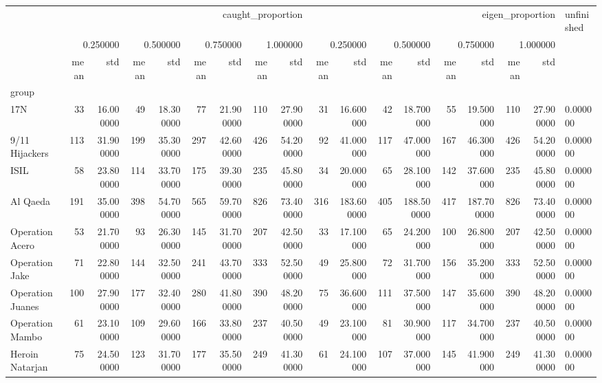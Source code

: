 \begin{tabular}{lrrrrrrrrrrrrrrrrl}
 & \multicolumn{8}{r}{caught_proportion} & \multicolumn{8}{r}{eigen_proportion} & unfinished \\
 & \multicolumn{2}{r}{0.250000} & \multicolumn{2}{r}{0.500000} & \multicolumn{2}{r}{0.750000} & \multicolumn{2}{r}{1.000000} & \multicolumn{2}{r}{0.250000} & \multicolumn{2}{r}{0.500000} & \multicolumn{2}{r}{0.750000} & \multicolumn{2}{r}{1.000000} &  \\
 & mean & std & mean & std & mean & std & mean & std & mean & std & mean & std & mean & std & mean & std &  \\
group &  &  &  &  &  &  &  &  &  &  &  &  &  &  &  &  &  \\
17N & 33 & 16.000000 & 49 & 18.300000 & 77 & 21.900000 & 110 & 27.900000 & 31 & 16.600000 & 42 & 18.700000 & 55 & 19.500000 & 110 & 27.900000 & 0.000000 \\
9/11 Hijackers & 113 & 31.900000 & 199 & 35.300000 & 297 & 42.600000 & 426 & 54.200000 & 92 & 41.000000 & 117 & 47.000000 & 167 & 46.300000 & 426 & 54.200000 & 0.000000 \\
ISIL & 58 & 23.800000 & 114 & 33.700000 & 175 & 39.300000 & 235 & 45.800000 & 34 & 20.000000 & 65 & 28.100000 & 142 & 37.600000 & 235 & 45.800000 & 0.000000 \\
Al Qaeda & 191 & 35.000000 & 398 & 54.700000 & 565 & 59.700000 & 826 & 73.400000 & 316 & 183.600000 & 405 & 188.500000 & 417 & 187.700000 & 826 & 73.400000 & 0.000000 \\
Operation Acero & 53 & 21.700000 & 93 & 26.300000 & 145 & 31.700000 & 207 & 42.500000 & 33 & 17.100000 & 65 & 24.200000 & 100 & 26.800000 & 207 & 42.500000 & 0.000000 \\
Operation Jake & 71 & 22.800000 & 144 & 32.500000 & 241 & 43.700000 & 333 & 52.500000 & 49 & 25.800000 & 72 & 31.700000 & 156 & 35.200000 & 333 & 52.500000 & 0.000000 \\
Operation Juanes & 100 & 27.900000 & 177 & 32.400000 & 280 & 41.800000 & 390 & 48.200000 & 75 & 36.600000 & 111 & 37.500000 & 147 & 35.600000 & 390 & 48.200000 & 0.000000 \\
Operation Mambo & 61 & 23.100000 & 109 & 29.600000 & 166 & 33.800000 & 237 & 40.500000 & 49 & 23.100000 & 81 & 30.900000 & 117 & 34.700000 & 237 & 40.500000 & 0.000000 \\
Heroin Natarjan & 75 & 24.500000 & 123 & 31.700000 & 177 & 35.500000 & 249 & 41.300000 & 61 & 24.100000 & 107 & 37.000000 & 145 & 41.900000 & 249 & 41.300000 & 0.000000 \\

\end{tabular}
